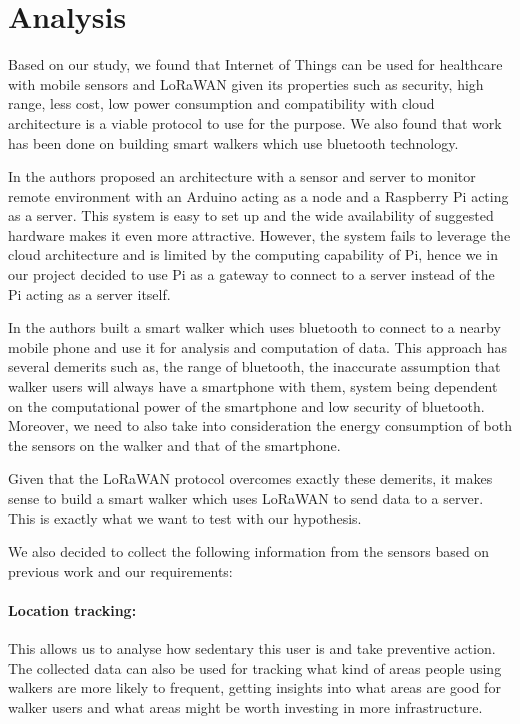 \chapter{Analysis}
\label{cha:analysis}

Based on our study, we found that Internet of Things can be used for healthcare with mobile sensors and LoRaWAN given its properties such as  security, high range, less cost, low power consumption and compatibility with cloud architecture is a viable protocol to use for the purpose. We also found that work has been done on building smart walkers which use bluetooth technology.

In \cite{erdoush2014wireless} the authors proposed an architecture with a sensor and server to monitor remote environment with an Arduino acting as a node and a Raspberry Pi acting as a server. This system is easy to set up and the wide availability of suggested hardware makes it even more attractive. However, the system fails to leverage the cloud architecture and is limited by the computing capability of Pi, hence we in our project decided to use Pi as a gateway to connect to a server instead of the Pi acting as a server itself.


In \cite{postolache2011smart} the authors built a smart walker which uses bluetooth to connect to a nearby mobile phone and use it for analysis and computation of data. This approach has several demerits such as, the range of bluetooth, the inaccurate assumption that walker users will always have a smartphone with them, system being dependent on the computational power of the smartphone and low security of bluetooth. Moreover, we need to also take into consideration the energy consumption of both the sensors on the walker and that of the smartphone.

Given that the LoRaWAN protocol overcomes exactly these demerits, it makes sense to build a smart walker which uses LoRaWAN to send data to a server.
This is exactly what we want to test with our hypothesis.


We also decided to collect the following information from the sensors based on previous work \cite{postolache2011smart} and our requirements: 

\subsubsection{Location tracking:}
This allows us to analyse how sedentary this user is and take preventive action. The collected data can also be used for tracking what kind of areas people using walkers are more likely to frequent, getting insights into what areas are good for walker users and what areas might be worth investing in more infrastructure.

